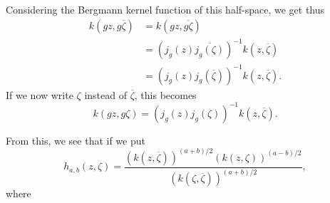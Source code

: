 Considering the Bergmann kernel function of this half-space, we get thus
\begin{align*}
k(gz,g\overline{\zeta}) &= k(gz,\overline{g\zeta})\\
&= (j_{g}(z)\overline{j_{g}(\zeta)})^{-1}k(z,\overline{\zeta})\\
&= (j_{g}(z)j_{g}(\overline{\zeta}))^{-1}k(z,\overline{\zeta}).
\end{align*}
If we now write $\zeta$ instead of $\overline{\zeta}$, this becomes
$$
k(gz,g\zeta)=(j_{g}(z)j_{g}(\zeta))^{-1}k(z,\overline{\zeta}).
$$

From this, we see that if we put
\setcounter{equation}{0}
\begin{equation}
h_{a,b}(z,\zeta)=\dfrac{(k(z,\overline{\zeta}))^{(a+b)/2}(k(z,\zeta))^{(a-b)/2}}{(k(\zeta,\overline{\zeta}))^{(a+b)/2}},\label{art13-eq4.1}
\end{equation}
where\pageoriginale 

